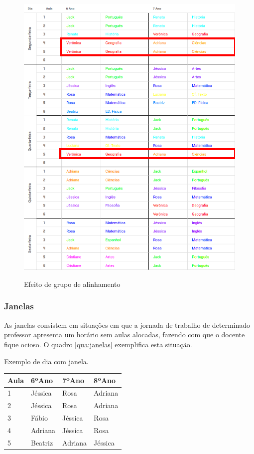 \begin{figure}[h]
	\centering
	\caption{Efeito de grupo de alinhamento}
	\includegraphics[width=1\textwidth]{./dados/figuras/alinhados}
	\label{fig:alinhados}
\end{figure}
\pagebreak

\subsubsection{Janelas}

As janelas consistem em situações em que a jornada de trabalho de determinado professor apresenta um horário sem aulas alocadas, fazendo com que o docente fique ocioso. O quadro \ref{qua:janelas} exemplifica esta situação.

\begin{quadro}[!htb]
	\centering
	\caption{Exemplo de dia com janela.\label{qua:janelas}}
	\begin{tabular}{|p{3cm}|p{3cm}|p{3cm}|p{3cm}|}
		\hline
		\textbf{Aula} & \textbf{6ºAno} & \textbf{7ºAno} & \textbf{8ºAno} \\
		\hline
		1 & Jéssica & Rosa & Adriana \\
		\hline
		2 & Jéssica & Rosa & Adriana \\
		\hline
		3 & Fábio & Jéssica & Rosa \\
		\hline
		4 & Adriana & Jéssica & Rosa \\
		\hline
		5 & Beatriz & Adriana & Jéssica \\
		\hline
	\end{tabular}
\end{quadro}

